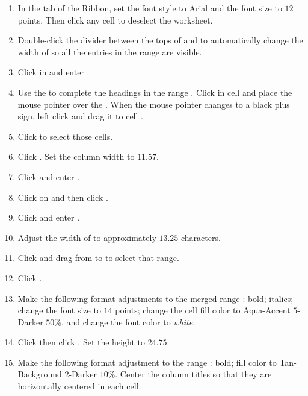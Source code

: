 \begin{enumerate}[resume]
	\item In the  tab of the Ribbon, set the font style to Arial and the font size to $ 12 $ points. Then click any cell to deselect the worksheet.
	\item Double-click the divider between the tops of  and  to automatically change the width of  so all the entries in the range  are visible. 
	\item Click in  and enter .
	\item Use the  to complete the headings in the range . Click in cell  and place the mouse pointer over the . When the mouse pointer changes to a black plus sign, left click and drag it to cell .
	\item Click  to select those cells. 
	\item Click . Set the column width to $ 11.57 $.
	\item Click  and enter .
	\item Click on  and then click .
	\item Click  and enter .
	\item Adjust the width of  to approximately $ 13.25 $ characters.
	\item Click-and-drag from  to  to select that range. 
	\item Click .
	\item Make the following format adjustments to the merged range : bold; italics; change the font size to $ 14 $ points; change the cell fill color to Aqua-Accent $ 5 $-Darker $ 50 $\%, and change the font color to \textit{white}.
	\item Click  then click . Set the height to $ 24.75 $.
	\item Make the following format adjustment to the range : bold; fill color to Tan-Background $ 2 $-Darker $ 10 $\%. Center the column titles so that they are horizontally centered in each cell.

\end{enumerate}
